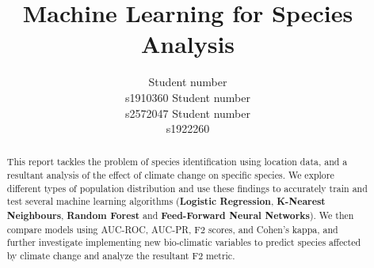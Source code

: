 \documentclass{article}
\title{Machine Learning for Species Analysis}
\author{
  Student number\\ s1910360
  \And
  Student number\\ s2572047
 \And
  Student number\\ s1922260
}
\begin{document}
\maketitle

\begin{abstract}
 This report tackles the problem of species identification using location data, and a resultant analysis of the effect of climate change on specific species. We explore different types of population distribution and use these findings to accurately train and test several machine learning algorithms (\textbf{Logistic Regression}, \textbf{K-Nearest Neighbours}, \textbf{Random Forest} and \textbf{Feed-Forward Neural Networks}). We then compare models using AUC-ROC, AUC-PR, F2 scores, and Cohen's kappa, and further investigate implementing new bio-climatic variables to predict species affected by climate change and analyze the resultant F2 metric.
\end{abstract}

% 

% 
\setlength{\textfloatsep}{2pt}













\newpage







 

\appendix

\end{document}
